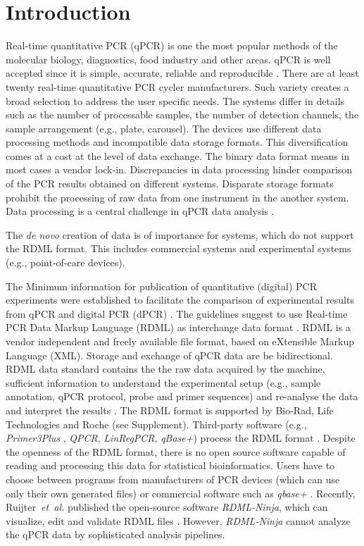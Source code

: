 \documentclass{bioinfo}
\begin{document}
	\section{Introduction}
	
	Real-time quantitative PCR (qPCR) is one the most popular 
	methods of the molecular biology, diagnostics, food industry and other areas. 
	qPCR is well accepted since it is simple, accurate, reliable and reproducible 
	\cite{pabinger_2014}. There are at least twenty real-time quantitative PCR 
	cycler manufacturers. Such variety creates a broad selection to address the user 
	specific needs. The systems differ in details such as the number of processable 
	samples, the number of detection channels, the sample arrangement (e.g., plate, 
	carousel). The devices use different data processing methods and incompatible 
	data storage formats. This diversification comes at a cost at the level of data 
	exchange. The binary data format means in most cases a vendor lock-in. 
	Discrepancies in data processing hinder comparison of the PCR results obtained 
	on different systems. Disparate storage formats prohibit the processing of raw 
	data from one instrument in the another system. Data processing is a central 
	challenge in qPCR data analysis \cite{roediger2015r, spiess_impact_2014}.
	  
	The \textit{de novo} creation of data is of importance for systems, which do 
	not support the RDML format. This includes commercial systems and experimental 
	systems (e.g.,  point-of-care devices).
	
	The Minimum information for publication of quantitative (digital) PCR 
	experiments  were established to facilitate the comparison of experimental 
	results from qPCR and digital PCR (dPCR) \cite{huggett_2013}. The guidelines 
	suggest to use Real-time PCR Data Markup Language (RDML) as interchange data 
	format \cite{rdml-ninja_2015}. RDML is a vendor independent and freely available 
	file format, based on eXtensible Markup Language (XML). Storage and exchange of 
	qPCR data are be bidirectional. RDML data standard contains the the raw data 
	acquired by the machine, sufficient information to understand the experimental 
	setup (e.g., sample annotation, qPCR protocol, probe and primer sequences) and 
	re-analyse the data and interpret the results \cite{lefever_rdml_2009}. The RDML 
	format is supported by Bio-Rad, Life Technologies and Roche (see Supplement). 
	Third-party software (e.g., \textit{Primer3Plus} \cite{untergasser_2007}, \textit{QPCR}, 
	\textit{LinRegPCR}, \textit{qBase+}) process the RDML format \cite{pabinger_2014, 
	rdml-ninja_2015}. Despite the openness of the RDML format, there is no open source 
	software capable of reading and processing this data for statistical 
	bioinformatics. Users have to choose between programs from manufacturers of PCR 
	devices (which can use only their own generated files) or commercial software 
	such as \textit{qbase+} \cite{pabinger_2014, rdml-ninja_2015}. Recently, 
	Ruijter~\textit{et~al.} published the open-source software \textit{RDML-Ninja}, 
	which can visualize, edit and validate RDML files \cite{rdml-ninja_2015}. 
	However, \textit{RDML-Ninja} cannot analyze the qPCR data by sophisticated 
	analysis pipelines. 
	
\end{document}

